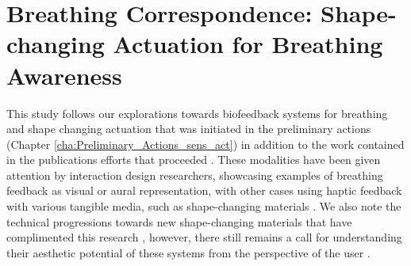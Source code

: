 
\section{Breathing Correspondence: Shape-changing Actuation for Breathing Awareness}

This study follows our explorations towards biofeedback systems for breathing and shape changing actuation that was initiated in the preliminary actions (Chapter \ref{cha:Preliminary_Actions_sens_act}) in addition to the work contained in the publications efforts that proceeded \cite{sanches_ambiguity_2019, alfaras_biodata_2020}. These modalities have been given attention by interaction design researchers, showcasing examples of breathing feedback as visual or aural representation, with other cases using haptic feedback with various tangible media, such as shape-changing materials \cite{prpa_inhaling_2020, miri_piv_2020}. We also note the technical progressions towards new shape-changing materials that have complimented this research \cite{coelho_shape-changing_2011}, however, there still remains a call for understanding their aesthetic potential of these systems from the perspective of the user \cite{rasmussen_shape-changing_2012,alexander_grand_2018}.

